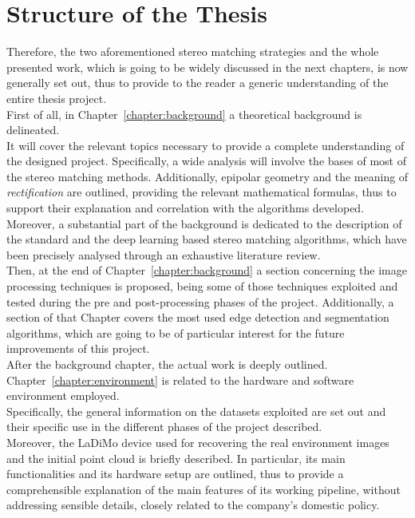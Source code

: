 \section{Structure of the Thesis}
\label{section:structure-of-thesis} 

Therefore, the two aforementioned stereo matching strategies and the whole presented work, which is going to be widely discussed in the next chapters, is now generally set out, thus to provide to the reader a generic understanding of the entire thesis project. \\ 
First of all, in Chapter~\ref{chapter:background} a theoretical background is delineated.\\
It will cover the relevant topics necessary to provide a complete understanding of the designed project.
Specifically, a wide analysis will involve the bases of most of the stereo matching methods.
Additionally, epipolar geometry and the meaning of \textit{rectification} are outlined, providing the relevant mathematical formulas, thus to support their explanation and correlation with the algorithms developed. \\
Moreover, a substantial part of the background is dedicated to the description of the standard and the deep learning based stereo matching algorithms, which have been precisely analysed through an exhaustive literature review.\\
Then, at the end of Chapter~\ref{chapter:background} a section concerning the image processing techniques is proposed, being some of those techniques exploited and tested during the pre and post-processing phases of the project.
Additionally, a section of that Chapter covers the most used edge detection and segmentation algorithms, which are going to be of particular interest for the future improvements of this project.\\
After the background chapter, the actual work is deeply outlined.
Chapter~\ref{chapter:environment} is related to the hardware and software environment employed.\\
Specifically, the general information on the datasets exploited are set out and their specific use in the different phases of the project described.\\
Moreover, the LaDiMo device used for recovering the real environment images and the initial point cloud is briefly described. 
In particular, its main functionalities and its hardware setup are outlined, thus to provide a comprehensible explanation of the main features of its working pipeline, without addressing sensible details, closely related to the company's domestic policy.\\

